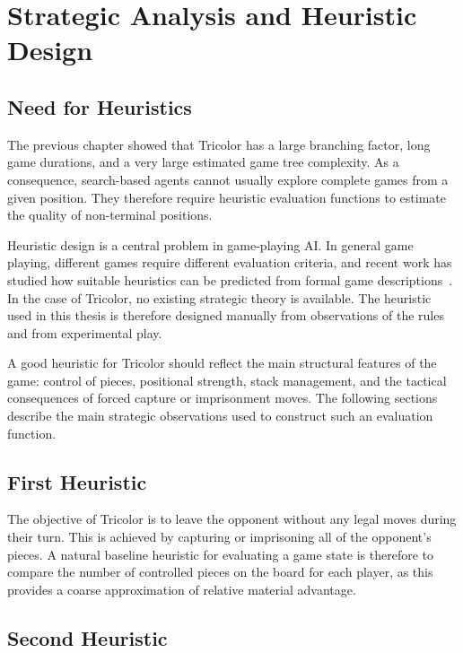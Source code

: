 \chapter{Strategic Analysis and Heuristic Design}
\label{heuristic_design}

\section{Need for Heuristics}

The previous chapter showed that Tricolor has a large branching factor, long game durations, and a very large estimated game tree complexity. As a consequence, search-based agents cannot usually explore complete games from a given position. They therefore require heuristic evaluation functions to estimate the quality of non-terminal positions.

Heuristic design is a central problem in game-playing AI. In general game playing, different games require different evaluation criteria, and recent work has studied how suitable heuristics can be predicted from formal game descriptions~\cite{stephenson2021heuristic}. In the case of Tricolor, no existing strategic theory is available. The heuristic used in this thesis is therefore designed manually from observations of the rules and from experimental play.

A good heuristic for Tricolor should reflect the main structural features of the game: control of pieces, positional strength, stack management, and the tactical consequences of forced capture or imprisonment moves. The following sections describe the main strategic observations used to construct such an evaluation function.

\section{First Heuristic}

The objective of Tricolor is to leave the opponent without any legal moves during their turn. This is achieved by capturing or imprisoning all of the opponent’s pieces. A natural baseline heuristic for evaluating a game state is therefore to compare the number of controlled pieces on the board for each player, as this provides a coarse approximation of relative material advantage.

\section{Second Heuristic}

